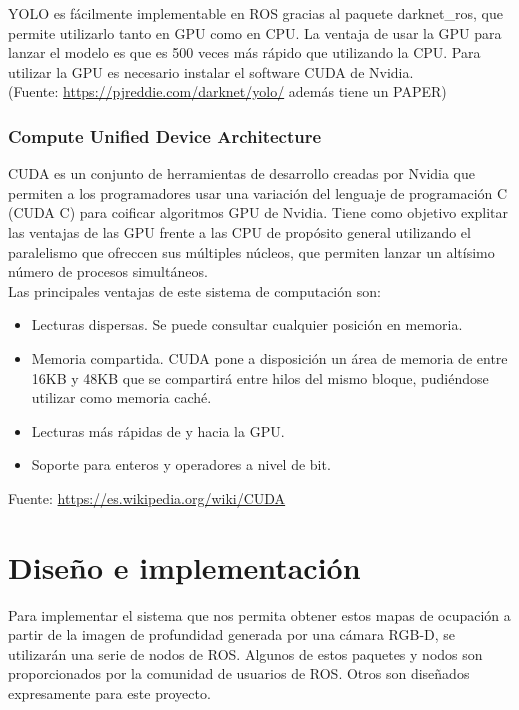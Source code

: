 YOLO es fácilmente implementable en ROS gracias al paquete darknet\_ros, que permite utilizarlo tanto en GPU como en CPU. La ventaja de usar la GPU para lanzar el modelo es que es 500 veces más rápido que utilizando la CPU. Para utilizar la GPU es necesario instalar el software CUDA de Nvidia.\\

(Fuente: \url{https://pjreddie.com/darknet/yolo/} además tiene un PAPER)\\

\subsection{Compute Unified Device Architecture}

CUDA es un conjunto de herramientas de desarrollo creadas por Nvidia que permiten a los programadores usar una variación del lenguaje de programación C (CUDA C) para coificar algoritmos GPU de Nvidia. Tiene como objetivo explitar las ventajas de las GPU frente a las CPU de propósito general utilizando el paralelismo que ofreccen sus múltiples núcleos, que permiten lanzar un altísimo número de procesos simultáneos.\\

Las principales ventajas de este sistema de computación son:

\begin{itemize}

	\item Lecturas dispersas. Se puede consultar cualquier posición en memoria.
	\item Memoria compartida. CUDA pone a disposición un área de memoria de entre 16KB y 48KB que se compartirá entre hilos del mismo bloque, pudiéndose utilizar como memoria caché.
	\item Lecturas más rápidas de y hacia la GPU.
	\item Soporte para enteros y operadores a nivel de bit.

\end{itemize}

Fuente: \url{https://es.wikipedia.org/wiki/CUDA}\\


\chapter{Diseño e implementación}

Para implementar el sistema que nos permita obtener estos mapas de ocupación a partir de la imagen de profundidad generada por una cámara RGB-D, se utilizarán una serie de nodos de ROS. Algunos de estos paquetes y nodos son proporcionados por la comunidad de usuarios de ROS. Otros son diseñados expresamente para este proyecto.\\

